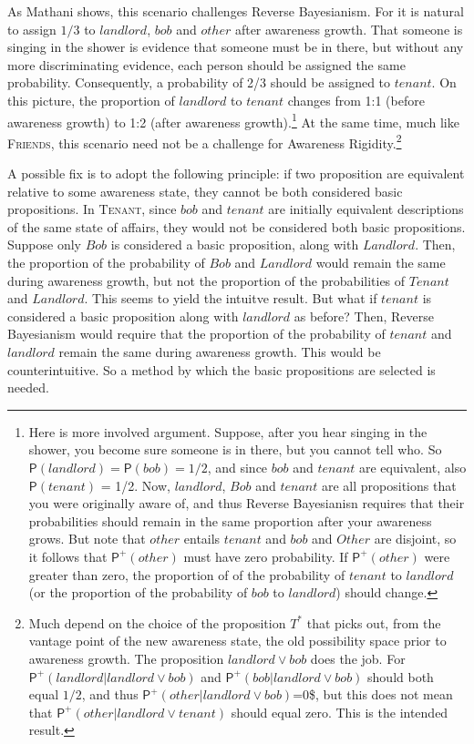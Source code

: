 \documentclass[
  11pt,
  dvipsnames,enabledeprecatedfontcommands]{scrartcl}
\newcommand{\pr}[1]{\ensuremath{\mathsf{P}(#1)}}
\newcommand{\ppr}[2]{\ensuremath{\mathsf{P}^{#1}(#2)}}
\begin{document}
As Mathani shows, this scenario challenges Reverse Bayesianism. For it
is natural to assign \(1/3\) to \(landlord\), \(bob\) and \(other\)
after awareness growth. That someone is singing in the shower is
evidence that someone must be in there, but without any more
discriminating evidence, each person should be assigned the same
probability. Consequently, a probability of 2/3 should be assigned to
\(tenant\). On this picture, the proportion of \(landlord\) to
\(tenant\) changes from 1:1 (before awareness growth) to 1:2 (after
awareness growth).\footnote{ Here is more involved argument. Suppose,
  after you hear singing in the shower, you become sure someone is in
  there, but you cannot tell who. So \(\pr{landlord} = \pr{bob} = 1/2\),
  and since \(bob\) and \(tenant\) are equivalent, also \(\pr{tenant}\)
  = 1/2. Now, \(landlord\), \(Bob\) and \(tenant\) are all propositions
  that you were originally aware of, and thus Reverse Bayesianisn
  requires that their probabilities should remain in the same proportion
  after your awareness grows. But note that \(other\) entails \(tenant\)
  and \(bob\) and \(Other\) are disjoint, so it follows that
  \(\ppr{+}{other}\) must have zero probability. If \(\ppr{+}{other}\)
  were greater than zero, the proportion of of the probability of
  \(tenant\) to \(landlord\) (or the proportion of the probability of
  \(bob\) to \(landlord\)) should change.} At the same time, much like
\textsc{Friends}, this scenario need not be a challenge for Awareness
Rigidity.\footnote{Much depend on the choice of the proposition \(T^*\)
  that picks out, from the vantage point of the new awareness state, the
  old possibility space prior to awareness growth. The proposition
  \(landlord \vee bob\) does the job. For
  \(\ppr{+}{landlord \vert landlord \vee bob}\) and
  \(\ppr{+}{bob \vert landlord \vee bob}\) should both equal \(1/2\),
  and thus \ppr{+}{other \vert landlord \vee bob}=0\$, but this does not
  mean that \(\ppr{+}{other \vert landlord \vee tenant}\) should equal
  zero. This is the intended result.}

A possible fix is to adopt the following principle: if two proposition
are equivalent relative to some awareness state, they cannot be both
considered basic propositions. In \textsc{Tenant}, since \(bob\) and
\(tenant\) are initially equivalent descriptions of the same state of
affairs, they would not be considered both basic propositions. Suppose
only \(Bob\) is considered a basic proposition, along with \(Landlord\).
Then, the proportion of the probability of \(Bob\) and \(Landlord\)
would remain the same during awareness growth, but not the proportion of
the probabilities of \(Tenant\) and \(Landlord\). This seems to yield
the intuitve result. But what if \(tenant\) is considered a basic
proposition along with \(landlord\) as before? Then, Reverse Bayesianism
would require that the proportion of the probability of \(tenant\) and
\(landlord\) remain the same during awareness growth. This would be
counterintuitive. So a method by which the basic propositions are
selected is needed.
\end{document}
